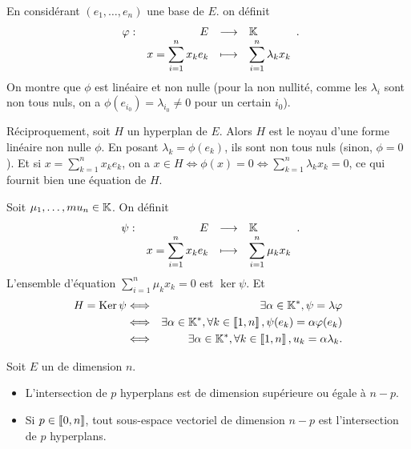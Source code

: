 \documentclass{magnolia}
\begin{document}
\begin{preuve}
En considérant $(e_1,\ldots,e_n)$ une base de $E$. on définit $$\begin{array}[t]{lrcl} \displaystyle{\varphi} : & \displaystyle{E} & \longrightarrow & \displaystyle{\ensuremath{\mathbb{K}}} \\ & \displaystyle{x=\sum_{i=1}^nx_k e_k} & \longmapsto & \displaystyle{\sum_{i=1}^n\lambda_k x_k} \end{array}.$$
On montre que $\phi$ est linéaire et non nulle (pour la non nullité, comme les $\lambda_i$ sont non tous nuls, on a $\phi(e_{i_0})=\lambda_{i_0}\neq 0$ pour un certain $i_0$).


Réciproquement, soit $H$ un hyperplan de $E$. Alors $H$ est le noyau d'une forme linéaire non nulle $\phi$. En posant $\lambda_k=\phi(e_k)$, ils sont non tous nuls (sinon, $\phi=0$). Et si $x=\displaystyle \sum_{k=1}^nx_ke_k$, on a $x\in H\Longleftrightarrow \phi(x)=0\Longleftrightarrow \displaystyle \sum_{k=1}^n\lambda_k x_k=0$, ce qui fournit bien une équation de $H$.


Soit $\mu_1,\ldots, mu_n \in \mathbb{K}$. On définit $$\begin{array}[t]{lrcl} \displaystyle{\psi} : & \displaystyle{E} & \longrightarrow & \displaystyle{\ensuremath{\mathbb{K}}} \\ & \displaystyle{x=\sum_{i=1}^nx_k e_k} & \longmapsto & \displaystyle{\sum_{i=1}^n\mu_k x_k} \end{array}.$$ L'ensemble d'équation $\sum_{i=1}^n\mu_k x_k=0$ est $\ker \psi$.
Et \begin{eqnarray*}
H=\mathop{\rm Ker} \psi &\Longleftrightarrow & \exists \alpha\in \mathbb{K}^*, \psi=\lambda \varphi\\
&\Longleftrightarrow & \exists \alpha\in \mathbb{K}^*, \forall k \in \left\llbracket 1,n\right\rrbracket, \psi(e_k)=\alpha\varphi(e_k)\\
&\Longleftrightarrow & \exists \alpha\in \mathbb{K}^*, \forall k \in \left\llbracket 1,n\right\rrbracket, u_k=\alpha\lambda_k.
\end{eqnarray*}
\end{preuve}

\begin{proposition}[utile=1]
Soit $E$ un \Kev de dimension $n$.
\begin{itemize}
\item L'intersection de $p$ hyperplans est de dimension supérieure ou égale à $n-p$.
\item Si $p\in \left\llbracket 0,n\right\rrbracket$, tout sous-espace vectoriel de dimension $n-p$ est l'intersection de $p$ hyperplans.
\end{itemize}
\end{proposition}
\end{document}
